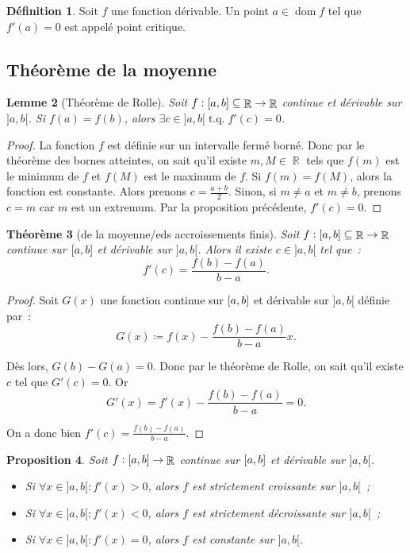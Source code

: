 \documentclass{article}
\DeclareMathOperator{\dom}{dom}
\DeclareMathOperator{\R}{\mathbb R}
\DeclareMathOperator{\tq}{ t.q. }
\newcommand{\ab}{\interval ab}
\newcommand{\fabr}[1]{#1 : \ab \to \R}
\newtheorem{thm}{Théorème}[section]
\newtheorem{prp}[thm]{Proposition}
\newtheorem{lem}[thm]{Lemme}
\theoremstyle{definition}
\newtheorem{déf}[thm]{Définition}
\theoremstyle{remark}
\begin{document}
		\begin{déf} Soit $f$ une fonction dérivable. Un point $a \in \dom f$ tel que $f'(a) = 0$ est appelé point critique. \end{déf}

	\subsection{Théorème de la moyenne}

		\begin{lem}[Théorème de Rolle] Soit $f : \ab \subseteq \R \to \R$ continue et dérivable sur $]a, b[$. Si $f(a) = f(b)$, alors
		$\exists c \in ]a, b[ \tq f'(c) = 0$. \end{lem}

		\begin{proof} La fonction $f$ est définie sur un intervalle fermé borné. Donc par le théorème des bornes atteintes, on sait qu'il existe $m, M \in \R$
		tels que $f(m)$ est le minimum de $f$ et $f(M)$ est le maximum de $f$. Si $f(m) = f(M)$, alors la fonction est constante. Alors prenons $c = \frac {a+b}2$.
		Sinon, si $m \neq a$ et $m \neq b$, prenons $c = m$ car $m$ est un extremum. Par la proposition précédente, $f'(c) = 0$. \end{proof}

		\begin{thm}[de la moyenne/eds accroissements finis] Soit $f : \ab \subseteq \R \to \R$ continue sur $\ab$ et dérivable sur $]a, b[$.
		Alors il existe $c \in ]a, b[$ tel que~:
		\[f'(c) = \frac {f(b)-f(a)}{b-a}.\]
		\end{thm}

		\begin{proof} Soit $G(x)$ une fonction continue sur $\ab$ et dérivable sur $]a, b[$ définie par~:
		\[G(x) \coloneqq f(x) - \frac {f(b)-f(a)}{b-a}x.\]

		Dès lors, $G(b)-G(a)=0$. Donc par le théorème de Rolle, on sait qu'il existe $c$ tel que $G'(c) = 0$. Or
		\[G'(x) = f'(x) - \frac {f(b)-f(a)}{b-a} = 0.\]

		On a donc bien $f'(c) = \frac {f(b)-f(a)}{b-a}$. \end{proof}

		\begin{prp} Soit $\fabr f$ continue sur $\ab$ et dérivable sur $]a, b[$.

		\begin{itemize}
			\item[$(i)$]   Si $\forall x \in ]a, b[ : f'(x) > 0$, alors $f$ est strictement croissante  sur $]a, b[$~;
			\item[$(ii)$]  Si $\forall x \in ]a, b[ : f'(x) < 0$, alors $f$ est strictement décroissante sur $]a, b[$~;
			\item[$(iii)$] Si $\forall x \in ]a, b[ : f'(x) = 0$, alors $f$ est constante sur $]a, b[$.
		\end{itemize}
		\end{prp}
\end{document}
